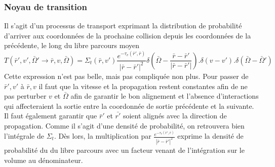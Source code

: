 \subsubsection{Noyau de transition}
Il s'agit d'un processus de transport exprimant la distribution de probabilité d'arriver aux 
coordonnées de la prochaine collision depuis les coordonnées de la précédente, le long du libre 
parcours moyen
\begin{equation}
T(\bar r',v',\bar \Omega ' \to \bar r,v,\bar \Omega ) = {\Sigma _t}(\bar r,v')\frac{{{e^{ - {\tau _v}(\bar r',\bar r)}}}}{{{{\left| {\bar r - \bar r'} \right|}^2}}}\delta \left( {\bar \Omega  - \frac{{\bar r - \bar r'}}{{\left| {\bar r - \bar r'} \right|}}} \right).\delta (v - v').\delta (\bar \Omega  - \bar \Omega ')
\end{equation}
Cette expression n'est pas belle, mais pas compliquée non plus. Pour passer de $\bar r', v'$ à 
$\bar r, v$ il faut que la vitesse et la propagation restent constantes afin de ne pas 
perturber $v$ et $\bar\Omega$ afin de garantir le bon alignement et l'absence d'interactions 
qui affecteraient la sortie entre la coordonnée de sortie précédente et la suivante. Il faut 
également garantir que $\bar r'$ et $\bar{r'}$ soient alignés avec la direction de propagation. 
Comme il s'agit d'une densité de probabilité, on retrouvera bien l'intégrale de $\Sigma_t$. Dès 
lors, la multiplication par $\frac{{{e^{ - {\tau _v}(\bar r',\bar r)}}}}{|\bar r - \bar r'|^2}$
exprime la densité de probabilité du du libre parcours avec un facteur venant de l'intégration sur le volume au dénominateur.


\newpage
